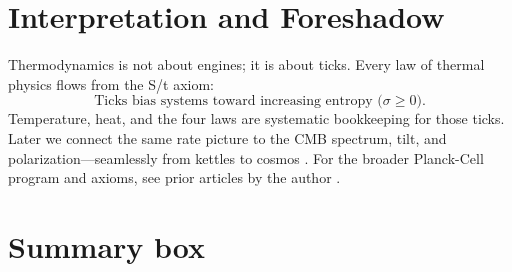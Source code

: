 \documentclass[11pt,oneside]{article}
\begin{document}
\section{Interpretation and Foreshadow}
Thermodynamics is not about engines; it is about ticks.
Every law of thermal physics flows from the S/t axiom:
\[
\text{Ticks bias systems toward increasing entropy (\(\sigma\ge 0\)).}
\]
Temperature, heat, and the four laws are systematic bookkeeping for those ticks.
Later we connect the same rate picture to the CMB spectrum, tilt, and polarization—seamlessly from kettles to cosmos \cite{peebles1993principles,planck2018params}. For the broader Planck-Cell program and axioms, see prior articles by the author \cite{langstaff_zenodo_16908311}.

\section*{Summary box}
\end{document}
